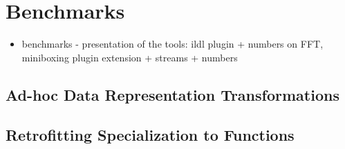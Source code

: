 \section{Benchmarks}
\label{sec:benchmarks}
\begin{itemize}
  \item benchmarks - presentation of the tools: ildl plugin + numbers on FFT, miniboxing plugin extension + streams + numbers
\end{itemize}

\subsection{Ad-hoc Data Representation Transformations}
\label{sec:benchmarks:ad-hoc}

\subsection{Retrofitting Specialization to Functions}
\label{sec:benchmarks:funcs}
